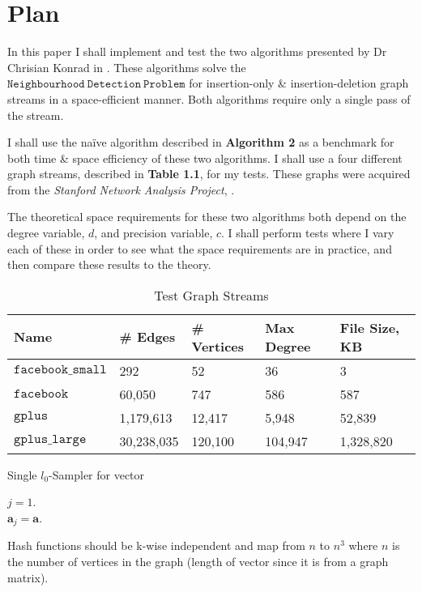 \documentclass[11pt,twoside,a4paper]{report}
\begin{document}
\section{Plan}
In this paper I shall implement and test the two algorithms presented by Dr Chrisian Konrad in \cite{orig}. These algorithms solve the $\mathtt{Neighbourhood\ Detection\ Problem}$ for insertion-only \& insertion-deletion graph streams in a space-efficient manner. Both algorithms require only a single pass of the stream.
\par I shall use the na\"ive algorithm described in \textbf{Algorithm 2} as a benchmark for both time \& space efficiency of these two algorithms. I shall use a four different graph streams, described in \textbf{Table 1.1}, for my tests. %
These graphs were acquired from the \textit{Stanford Network Analysis Project}, \cite{SNAP}.
\par The theoretical space requirements for these two algorithms both depend on the degree variable, $d$, and precision variable, $c$. I shall perform tests where I vary each of these in order to see what the space requirements are in practice, and then compare these results to the theory.

\begin{table}[h]
\caption{Test Graph Streams}
\begin{tabular}{|l|l|l|l|l|}
\hline
Name&\# Edges&\# Vertices&Max Degree&File Size, KB\\\hline
$\mathtt{facebook\_small}$&292&52&36&3\\
$\mathtt{facebook}$&60,050&747&586&587\\
$\mathtt{gplus}$&1,179,613&12,417&5,948&52,839\\
$\mathtt{gplus\_large}$&30,238,035&120,100&104,947&1,328,820\\\hline
\end{tabular}
\label{Tab:Tcr}
\end{table}

\newpage
\begin{algorithm}[H]
\caption{Single $l_0$-Sampler for vector}
$j=1$.\\
$\textbf{a}_j=\textbf{a}$.\\
\end{algorithm}
Hash functions should be k-wise independent and map from $n$ to $n^3$ where $n$ is the number of vertices in the graph (\ie length of vector since it is from a graph matrix).
\end{document}
